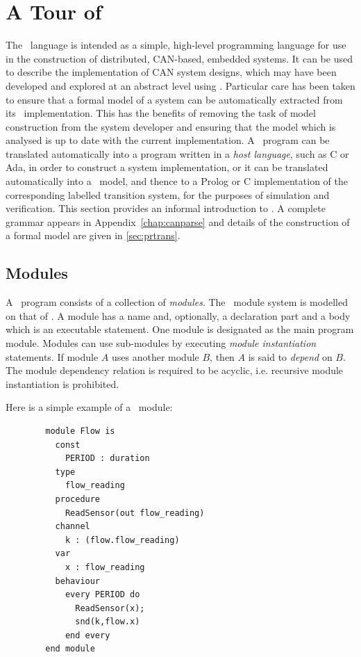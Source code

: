 \section{A Tour of \candle\label{sec:prinformal}}
The \candle\ language is intended as a simple, high-level programming
language for use in the construction of distributed, CAN-based,
embedded systems. It can be used to describe the implementation of CAN
system designs, which may have been developed and explored at an
abstract level using \bcandle. Particular care has been taken to
ensure that a formal model of a system can be automatically extracted
from its \candle\ implementation. This has the benefits of removing
the task of model construction from the system developer and ensuring
that the model which is analysed is up to date with the current
implementation.  A \candle\ program can be translated automatically
into a program written in a \emph{host language}, such as C or Ada, in
order to construct a system implementation, or it can be translated
automatically into a \bcandle\ model, and thence to a Prolog or C
implementation of the corresponding labelled transition system, for
the purposes of simulation and verification. This section provides an
informal introduction to \candle. A complete grammar appears in
Appendix~\ref{chap:canparse} and details of the construction of a
formal model are given in \Sec\ref{sec:prtrans}.

\subsection{Modules}
A \candle\ program consists of a collection of \emph{modules}.  The
\candle\ module system is modelled on that of \esterel.  A module has a
name and, optionally, a declaration part and a body which is an
executable statement. One module is designated as the main program
module. Modules can use sub-modules by executing \emph{module
instantiation} statements. If module $A$ uses another module $B$, then
$A$ is said to \emph{depend} on $B$. The module dependency relation is
required to be acyclic, i.e. recursive module instantiation is prohibited.

Here is a simple example of a \candle\ module:
\begin{verbatim}
        module Flow is
          const 
            PERIOD : duration
          type
            flow_reading
          procedure
            ReadSensor(out flow_reading)
          channel
            k : (flow.flow_reading)
          var
            x : flow_reading
          behaviour
            every PERIOD do
              ReadSensor(x);
              snd(k,flow.x)
            end every
        end module
\end{verbatim}

